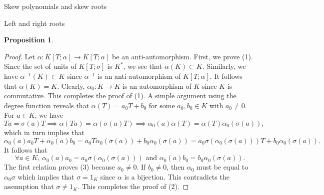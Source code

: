 \documentclass[11pt,a4paper]{article}
\theoremstyle{theorem}
\newtheorem{proposition}[theorem]{Proposition}
\numberwithin{equation}{section}
\newcommand{\s}{\sigma}
\begin{document}
\begin{section}{Skew polynomials and skew roots}
\begin{subsection}{Left and right roots}
\begin{proposition}
	\end{proposition} 
	\begin{proof}
		Let $\alpha:K[T;\alpha]\to K[T;\alpha]$ be an anti-automorphism. First, we prove (1). Since the set of units of $K[T;\s]$ is $K^*$, we see that $\alpha(K)\subset K$. Similarly, we have $\alpha^{-1}(K)\subset K$ since $\alpha^{-1}$ is an anti-automorphism of $K[T;\alpha]$. It follows that $\alpha(K)=K$. Clearly, $\alpha_0:K\to K$ is an automorphism of $K$ since $K$ is commutative. This completes the proof of (1).  A simple argument using the degree function reveals that $\alpha(T)=a_0T+b_0$ for some $a_0,b_0\in K$ with $a_0\neq 0$.
		For $a\in K$, we have
		$$Ta=\s(a)T\implies \alpha(Ta)=\alpha (\s(a)T) \implies
		\alpha_0(a)\alpha(T)=\alpha (T)\alpha_0 (\s(a)),$$
		which in turn implies that 
		$$ \alpha_0(a)a_0T+\alpha_0(a)b_0=a_0T\alpha_0 (\s(a))+b_0\alpha_0(\s(a))=a_0\s(\alpha_0 (\s(a)))T+b_0\alpha_0(\s(a)).$$
		It follows that
		$$\forall a\in K, \, \alpha_0(a)a_0=a_0\s(\alpha_0 (\s(a))) \text{ and } \alpha_0(a)b_0= b_0\alpha_0 (\s(a)).$$
		The first relation proves (3)  because $a_0\neq 0$. If $b_0\neq 0$, then $\alpha_0$ must be equal to $\alpha_0\s$ which implies that $\s=1_K$ since $\alpha$ is a bijection. This contradicts the assumption that $\s\neq 1_K$. This completes the proof of (2). 
		

\end{proof}
\end{subsection}
\end{section}
\end{document}
